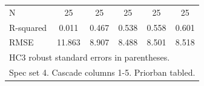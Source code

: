 \begin{table}[htbp]
\begin{tabular}{l*{5}{c}}
\midrule
N           &          25   &          25   &          25   &          25   &          25   \\
R-squared   &       0.011   &       0.467   &       0.538   &       0.558   &       0.601   \\
RMSE        &      11.863   &       8.907   &       8.488   &       8.501   &       8.518   \\
\bottomrule
\multicolumn{6}{l}{\footnotesize HC3 robust standard errors in parentheses.}\\
\multicolumn{6}{l}{\footnotesize Spec set 4. Cascade columns 1-5. Priorban tabled.}\\
\end{tabular}
\end{table}

